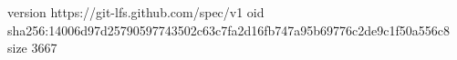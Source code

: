 version https://git-lfs.github.com/spec/v1
oid sha256:14006d97d25790597743502c63c7fa2d16fb747a95b69776c2de9c1f50a556c8
size 3667

